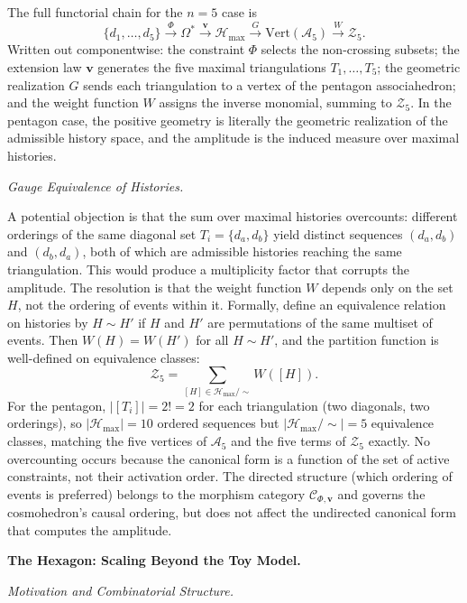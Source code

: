 \documentclass[12pt, oneside]{amsart}
\theoremstyle{plain}
\theoremstyle{definition}
\theoremstyle{remark}
\newcommand{\Phif}{\Phi}
\newcommand{\OmKS}{\Omega}
\newcommand{\Ccat}{\mathcal{C}_{\Phi,\mathbf{v}}}
\newcommand{\Hmax}{\mathcal{H}_{\max}}
\begin{document}
The full functorial chain for the $n=5$ case is
\begin{equation}
\label{eq:composite-map}
  \{d_1,\ldots,d_5\} \xrightarrow{\Phif} \OmKS^* \xrightarrow{\mathbf{v}} \Hmax \xrightarrow{G} \mathrm{Vert}(\mathcal{A}_5) \xrightarrow{W} \mathcal{Z}_5.
\end{equation}
Written out componentwise: the constraint $\Phif$ selects the non-crossing subsets; the extension law $\mathbf{v}$ generates the five maximal triangulations $T_1, \ldots, T_5$; the geometric realization $G$ sends each triangulation to a vertex of the pentagon associahedron; and the weight function $W$ assigns the inverse monomial, summing to $\mathcal{Z}_5$. In the pentagon case, the positive geometry is literally the geometric realization of the admissible history space, and the amplitude is the induced measure over maximal histories.

\medskip\noindent\textit{Gauge Equivalence of Histories.}

A potential objection is that the sum over maximal histories overcounts: different orderings of the same diagonal set $T_i = \{d_a, d_b\}$ yield distinct sequences $(d_a, d_b)$ and $(d_b, d_a)$, both of which are admissible histories reaching the same triangulation. This would produce a multiplicity factor that corrupts the amplitude. The resolution is that the weight function $W$ depends only on the set $H$, not the ordering of events within it. Formally, define an equivalence relation on histories by $H \sim H'$ if $H$ and $H'$ are permutations of the same multiset of events. Then $W(H) = W(H')$ for all $H \sim H'$, and the partition function is well-defined on equivalence classes: \[
  \mathcal{Z}_5 = \sum_{[H] \in \Hmax/\!\sim} W([H]).
\]
For the pentagon, $|[T_i]| = 2! = 2$ for each triangulation (two diagonals, two orderings), so $|\Hmax| = 10$ ordered sequences but $|\Hmax/\!\sim| = 5$ equivalence classes, matching the five vertices of $\mathcal{A}_5$ and the five terms of $\mathcal{Z}_5$ exactly. No overcounting occurs because the canonical form is a function of the set of active constraints, not their activation order. The directed structure (which ordering of events is preferred) belongs to the morphism category $\Ccat$ and governs the cosmohedron's causal ordering, but does not affect the undirected canonical form that computes the amplitude.

\bigskip\noindent\textbf{The Hexagon: Scaling Beyond the Toy Model.}
\label{sec:hexagon}

\medskip\noindent\textit{Motivation and Combinatorial Structure.}
\end{document}
